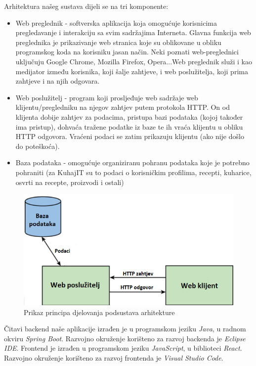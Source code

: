	Arhitektura našeg sustava dijeli se na tri komponente:
	\begin{itemize}
		\item Web preglednik - softverska aplikacija koja omogućuje korisnicima pregledavanje i interakciju sa svim sadržajima Interneta. Glavna funkcija web preglednika je prikazivanje web stranica koje su oblikovane u obliku programskog koda na korisniku jasan način. Neki poznati web-preglednici uključuju Google Chrome, Mozilla Firefox, Opera...Web preglednik služi i kao medijator između korisnika, koji šalje zahtjeve, i web poslužitelja, koji prima zahtjeve i na njih odgovara.
		\item Web poslužitelj - program koji prosljeđuje web sadržaje web klijentu/pregledniku na njegov zahtjev putem protokola HTTP. On od klijenta dobije zahtjev za podacima, pristupa bazi podataka (kojoj također ima pristup), dohvaća tražene podatke iz baze te ih vraća klijentu u obliku HTTP odgovora. Vraćeni podaci se zatim prikazuju klijentu (ako nije došlo do poteškoća).
		\item Baza podataka - omogućuje organiziranu pohranu podataka koje je potrebno pohraniti (za KuhajIT su to podaci o korisničkim profilima, recepti, kuharice, osvrti na recepte, proizvodi i ostali)
	\end{itemize}
	
		\begin{figure}[H]
			\includegraphics[scale=0.4]{slike/architecture.PNG} %
			\centering
			\caption{Prikaz principa djelovanja podsustava arhitekture}
			\label{architecture}
		\end{figure}
	

	Čitavi backend naše aplikacije izrađen je u programskom jeziku \textit{Java}, u radnom okviru \textit{Spring Boot}. Razvojno okruženje korišteno za razvoj backenda je \textit{Eclipse IDE}.
	Frontend je izrađen u programskom jeziku \textit{JavaScript}, u biblioteci \textit{React}. Razvojno okruženje korišteno za razvoj frontenda je \textit{Visual Studio Code}.
			
